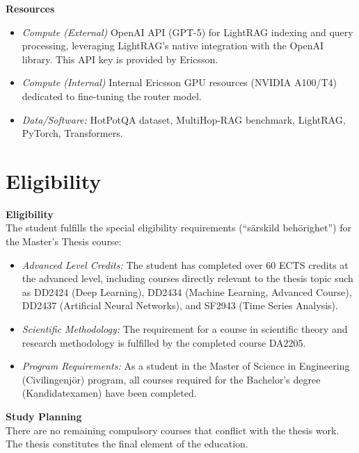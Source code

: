\documentclass[11pt, a4paper]{article}
\begin{document}
\textbf{Resources}
\begin{itemize}[label=--]
    \item \emph{Compute (External)} OpenAI API (GPT-5) for LightRAG indexing and query processing, leveraging LightRAG's native integration with the OpenAI library. This API key is provided by Ericsson.
    \item \emph{Compute (Internal)} Internal Ericsson GPU resources (NVIDIA A100/T4) dedicated to fine-tuning the router model.
    \item \emph{Data/Software:} HotPotQA dataset, MultiHop-RAG benchmark, LightRAG, PyTorch, Transformers.
\end{itemize}

\section{Eligibility}

\textbf{Eligibility} \\
The student fulfills the special eligibility requirements (``särskild behörighet'') for the Master's Thesis course:
\begin{itemize}[label=--]
    \item \emph{Advanced Level Credits:} The student has completed over 60 ECTS credits at the advanced level, including courses directly relevant to the thesis topic such as DD2424 (Deep Learning), DD2434 (Machine Learning, Advanced Course), DD2437 (Artificial Neural Networks), and SF2943 (Time Series Analysis).
    \item \emph{Scientific Methodology:} The requirement for a course in scientific theory and research methodology is fulfilled by the completed course DA2205.
    \item \emph{Program Requirements:} As a student in the Master of Science in Engineering (Civilingenjör) program, all courses required for the Bachelor's degree (Kandidatexamen) have been completed.
\end{itemize}

\textbf{Study Planning} \\
There are no remaining compulsory courses that conflict with the thesis work. The thesis constitutes the final element of the education.

\newpage
\end{document}
